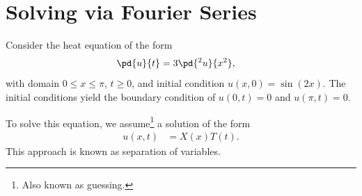 \documentclass[10pt]{mypackage}
\begin{document}
\section{Solving via Fourier Series}%
\begin{example}
  Consider the heat equation of the form
  \begin{align*}
    \pd{u}{t} &= 3\pd{^2u}{x^2},
  \end{align*}
  with domain $0\leq x \leq \pi$, $t\geq 0$, and initial condition $u\left( x,0 \right) = \sin\left(2x\right)$. The initial conditions yield the boundary condition of $u\left( 0,t \right) = 0$ and $u\left( \pi,t \right) = 0$.\newline

  To solve this equation, we assume\footnote{Also known as guessing.} a solution of the form
  \begin{align*}
    u\left( x,t \right) &= X(x)T(t).
  \end{align*}
  This approach is known as separation of variables.\newline


\end{example}
\end{document}
